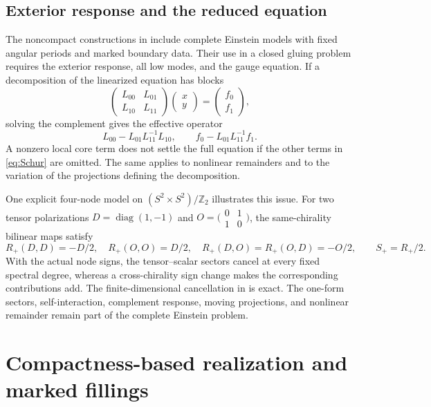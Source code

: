 \documentclass[11pt,a4paper]{article}
\theoremstyle{definition}\newtheorem{definition}[theorem]{Definition}
\theoremstyle{remark}\newtheorem{remark}[theorem]{Remark}
\newcommand{\Z}{\mathbb Z}
\begin{document}
\subsection{Exterior response and the reduced equation}
The noncompact constructions in \cite{source-construction} include complete Einstein models with fixed angular periods and marked boundary data. Their use in a closed gluing problem requires the exterior response, all low modes, and the gauge equation. If a decomposition of the linearized equation has blocks
\[
 \begin{pmatrix}L_{00}&L_{01}\\L_{10}&L_{11}\end{pmatrix}
 \begin{pmatrix}x\\y\end{pmatrix}
 =\begin{pmatrix}f_0\\f_1\end{pmatrix},
\]
solving the complement gives the effective operator
\begin{equation}\label{eq:Schur}
 L_{00}-L_{01}L_{11}^{-1}L_{10},
 \qquad f_0-L_{01}L_{11}^{-1}f_1.
\end{equation}
A nonzero local core term does not settle the full equation if the other terms in \eqref{eq:Schur} are omitted. The same applies to nonlinear remainders and to the variation of the projections defining the decomposition.

One explicit four-node model on $(S^2\times S^2)/\Z_2$ illustrates this issue. For two tensor polarizations $D=\operatorname{diag}(1,-1)$ and $O=\bigl(\begin{smallmatrix}0&1\\1&0\end{smallmatrix}\bigr)$, the same-chirality bilinear maps satisfy
\[
 R_+(D,D)=-D/2,\quad R_+(O,O)=D/2,\quad
 R_+(D,O)=R_+(O,D)=-O/2,\qquad S_+=R_+/2.
\]
With the actual node signs, the tensor--scalar sectors cancel at every fixed spectral degree, whereas a cross-chirality sign change makes the corresponding contributions add. The finite-dimensional cancellation in \cite{source-nodes} is exact. The one-form sectors, self-interaction, complement response, moving projections, and nonlinear remainder remain part of the complete Einstein problem.

\section{Compactness-based realization and marked fillings}
\end{document}
